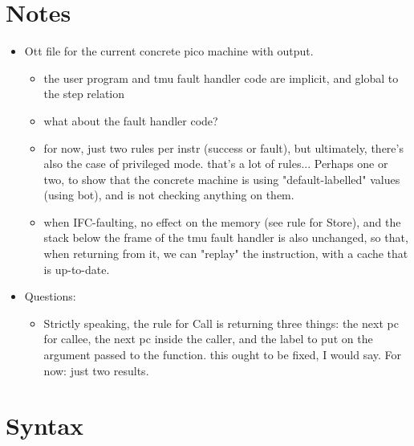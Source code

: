 \documentclass{article}
\begin{document}
\section*{Notes}

\begin{itemize}
\item Ott file for the current concrete pico machine with output.
  \begin{itemize}
    \item the user program and tmu fault handler code are implicit,
      and global to the step relation
    \item what about the fault handler code? 
    \item for now, just two rules per instr (success or fault), but
      ultimately, there's also the case of privileged mode.
      that's a lot of rules...
      Perhaps one or two, to show that the concrete machine is 
      using "default-labelled" values (using bot), and is not checking
      anything on them.
    \item when IFC-faulting, no effect on the memory (see rule for
      Store), and the stack below the frame of the tmu fault handler
      is also unchanged, so that, when returning from it, we can
      "replay" the instruction, with a cache that is up-to-date.
  \end{itemize}
\item Questions:
  \begin{itemize}
    \item Strictly speaking, the rule for Call is returning three
      things: the next pc for callee, the next pc inside the caller,
      and the label to put on the argument passed to the function.
      this ought to be fixed, I would say. For now: just two results.
  \end{itemize}
\end{itemize}

\section*{Syntax}

\ottmetavars\\[3ex]

\ottgrammartabular{
\ottn\ottinterrule
\ottL\ottinterrule
\otta\ottinterrule
\ottinstr\ottinterrule
\ottS\ottinterrule
}
\end{document}
